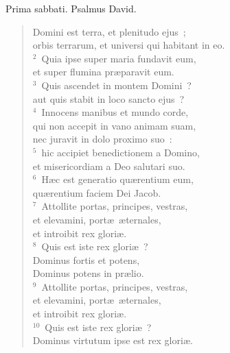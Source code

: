 \bchapter
\lettrine[lines=3,image=true,loversize=0.05,lraise=-0.03]{P}{}rima sabbati. Psalmus David. \begin{flushleft}\begin{verse}\vspace{6pt}Domini est terra, et plenitudo ejus~;\\ orbis terrarum, et universi qui habitant in eo.\\
${}^{2}$~Quia ipse super maria fundavit eum,\\ et super flumina pr\ae paravit eum.\\
${}^{3}$~Quis ascendet in montem Domini~?\\ aut quis stabit in loco sancto ejus~?\\
${}^{4}$~Innocens manibus et mundo corde,\\ qui non accepit in vano animam suam,\\ nec juravit in dolo proximo suo~:\\
${}^{5}$~hic accipiet benedictionem a Domino,\\ et misericordiam a Deo salutari suo.\\
${}^{6}$~H\ae c est generatio qu\ae rentium eum,\\ qu\ae rentium faciem Dei Jacob.\\
${}^{7}$~Attollite portas, principes, vestras,\\ et elevamini, port\ae\ \ae ternales,\\ et introibit rex glori\ae .\\
${}^{8}$~Quis est iste rex glori\ae~?\\ Dominus fortis et potens,\\ Dominus potens in pr\ae lio.\\
${}^{9}$~Attollite portas, principes, vestras,\\ et elevamini, port\ae\ \ae ternales,\\ et introibit rex glori\ae .\\
${}^{10}$~Quis est iste rex glori\ae~?\\ Dominus virtutum ipse est rex glori\ae .\end{verse}\end{flushleft}



